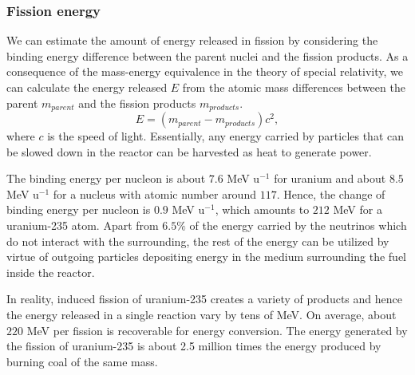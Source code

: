 \documentclass[nofootinbib,preprint,aps]{revtex4-1}
\begin{document}
        \subsubsection{Fission energy}
        We can estimate the amount of energy released in fission by considering the binding energy difference
        between the parent nuclei and the fission products. As a consequence of the mass-energy equivalence in the theory
        of special relativity, we can calculate the energy released $E$ from the atomic mass differences between the parent $m_{parent}$
        and the fission products $m_{products}$.
        \begin{equation}
            E = (m_{parent}-m_{products})c^2,
        \end{equation}
        where $c$ is the speed of light.
        Essentially, any energy carried by particles that can be slowed down 
        in the reactor can be harvested as heat to generate power.

        The binding energy per nucleon is about $7.6$ MeV u${}^{-1}$ for uranium and about $8.5$ MeV u${}^{-1}$
        for a nucleus with atomic number around $117$. Hence, the change of binding energy per nucleon is
        $0.9$ MeV u${}^{-1}$, which amounts to $212$ MeV for a uranium-235 atom.
        Apart from $6.5\%$ of the energy carried by the neutrinos which do not interact with the surrounding,
        the rest of the energy can be utilized by virtue of outgoing particles depositing energy in the medium
        surrounding the fuel inside the reactor.

        In reality, induced fission of uranium-235 creates a variety of products and hence the energy released
        in a single reaction vary by tens of MeV. On average, about $220$ MeV per fission is recoverable for energy conversion.
        The energy generated by the fission of uranium-235 is 
        about 2.5 million times the energy produced by burning coal of the same mass.\cite{e17}
\end{document}
